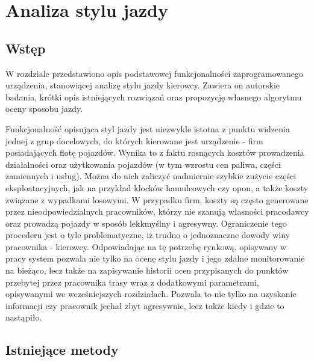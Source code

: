 \chapter{Analiza stylu jazdy}

\section{Wstęp}

W rozdziale przedstawiono opis podstawowej funkcjonalności zaprogramowanego urządzenia, stanowiącej analizę stylu jazdy kierowcy. Zawiera on autorskie badania, krótki opis istniejących rozwiązań oraz propozycję własnego algorytmu oceny sposobu jazdy. 

Funkcjonalność opisująca styl jazdy jest niezwykle istotna z punktu widzenia jednej z grup docelowych, do których kierowane jest urządzenie - firm posiadających flotę pojazdów. Wynika to z faktu rosnących kosztów prowadzenia działalności oraz użytkowania pojazdów (w tym wzrostu cen paliwa, części zamiennych i usług). Można do nich zaliczyć nadmiernie szybkie zużycie części eksploatacyjnych, jak na przykład klocków hamulcowych czy opon, a także koszty związane z wypadkami losowymi. W przypadku firm, koszty są często generowane przez nieodpowiedzialnych pracowników, którzy nie szanują własności pracodawcy oraz prowadzą pojazdy w sposób lekkmyślny i agresywny. Ograniczenie tego procederu jest o tyle problematyczne, iż trudno o jednoznaczne dowody winy pracownika - kierowcy. Odpowiadając na tę potrzebę rynkową, opisywany w pracy system pozwala nie tylko na ocenę stylu jazdy i jego zdalne monitorowanie na bieżąco, lecz także na zapisywanie historii ocen przypisanych do punktów przebytej przez pracownika trasy wraz z dodatkowymi parametrami, opisywanymi we wcześniejszych rozdziałach. Pozwala to nie tylko na uzyskanie informacji czy pracownik jechał zbyt agresywnie, lecz także kiedy i gdzie to nastąpiło.

\clearpage
\section{Istniejące metody}

